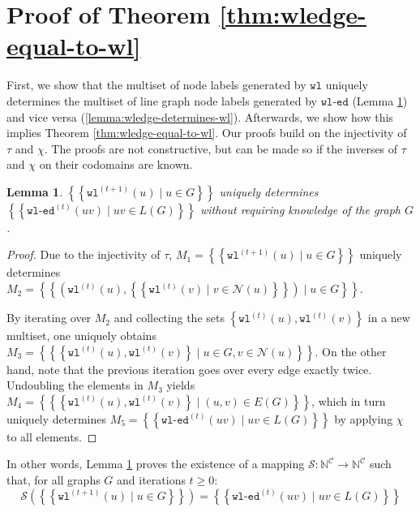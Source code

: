 \documentclass{article}
\newtheorem{lemma}[theorem]{Lemma}
\newcommand{\set}[1]{\left\{#1\right\}}
\newcommand{\multiset}[1]{\left\{\!\!\left\{#1\right\}\!\!\right\}}
\newcommand{\iter}[1]{^{(#1)}}
\newcommand{\wl}{\texttt{wl}}
\newcommand{\wledge}{\texttt{wl-ed}}
\newcommand{\dec}{\chi}
\newcommand{\hash}{\tau}
\newcommand{\nbh}{\mathcal{N}}
\newcommand{\mcc}{\mathcal{C}}
\newcommand{\mcs}{\mathcal{S}}
\newcommand{\mbn}{\mathbb{N}}
\begin{document}
\section{Proof of Theorem \ref{thm:wledge-equal-to-wl}}   \label{app:proof-wledge-equal-to-wl}


First, we show that the multiset of node labels generated by $\wl$ uniquely determines the multiset of line graph node labels generated by $\wledge$ (Lemma \ref{lemma:wl-determines-wledge}) and vice versa (\ref{lemma:wledge-determines-wl}). Afterwards, we show how this implies Theorem \ref{thm:wledge-equal-to-wl}. Our proofs build on the injectivity of $\hash$ and $\dec$. The proofs are not constructive, but can be made so if the inverses of $\hash$ and $\dec$ on their codomains are known.

\begin{lemma}   \label{lemma:wl-determines-wledge}
    $\multiset{\wl\iter{t+1}(u) \mid u\in G}$ uniquely determines $\multiset{\wledge\iter{t}(uv) \mid uv\in L(G)}$ without requiring knowledge of the graph $G$.
\end{lemma}
\begin{proof}
    Due to the injectivity of $\hash$,
    $M_1 = \multiset{\wl\iter{t+1}(u) \mid u\in G}$
    uniquely determines
    $M_2 = \multiset{\left(
        \wl\iter{t}(u),
        \multiset{\wl\iter{t}(v) \mid v\in \nbh(u)}
    \right) \mid u\in G}$.

    By iterating over $M_2$ and collecting the sets $\set{\wl\iter{t}(u), \wl\iter{t}(v)}$ in a new multiset, one uniquely obtains $M_3 = \multiset{\set{\wl\iter{t}(u), \wl\iter{t}(v)} \mid u\in G, v\in\nbh(u)}$.
    On the other hand, note that the previous iteration goes over every edge exactly twice. Undoubling the elements in $M_3$ yields $M_4 = \multiset{\set{\wl\iter{t}(u), \wl\iter{t}(v)} \mid (u,v)\in E(G)}$, which in turn uniquely determines $M_5 = \multiset{\wledge\iter{t}(uv) \mid uv\in L(G)}$ by applying $\dec$ to all elements.
\end{proof}
In other words, Lemma \ref{lemma:wl-determines-wledge} proves the existence of a mapping $\mcs: \mbn^\mcc \rightarrow \mbn^\mcc$ such that, for all graphs $G$ and iterations $t\geq0$:
\begin{equation}
    \mcs\left(\multiset{\wl\iter{t+1}(u) \mid u\in G}\right) = \multiset{\wledge\iter{t}(uv) \mid uv\in L(G)}
\end{equation}
\end{document}
